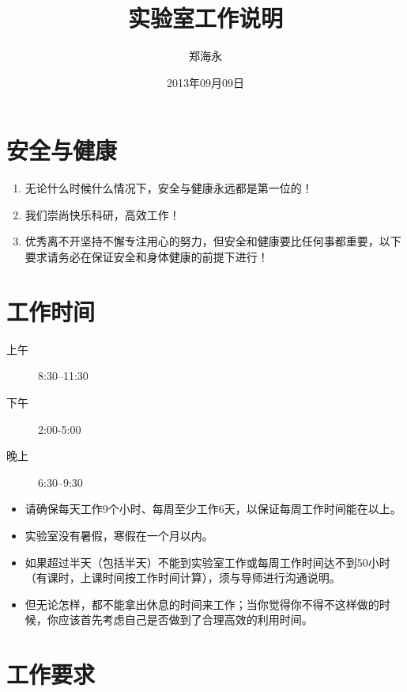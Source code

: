 \documentclass[a4paper，12pt]{article}
\title{实验室工作说明} %
\author{郑海永}
\date{2013年09月09日} %
\begin{document}
\maketitle

\section{安全与健康}

\begin{enumerate}
\item 无论什么时候什么情况下，安全与健康永远都是第一位的！
\item 我们崇尚快乐科研，高效工作！
\item 优秀离不开坚持不懈专注用心的努力，但安全和健康要比任何事都重要，以下要求请务必在保证安全和身体健康的前提下进行！
\end{enumerate}

\section{工作时间}

\begin{description}

\item[上午] 8:30--11:30

\item[下午] 2:00-5:00

\item[晚上] 6:30--9:30

\end{description}

\begin{itemize}

\item 请确保每天工作9个小时、每周至少工作6天，以保证每周工作时间能在{\color{red}{50小时}}以上。

\item 实验室没有暑假，寒假在一个月以内。

\item 如果超过半天（包括半天）不能到实验室工作或每周工作时间达不到50小时（有课时，上课时间按工作时间计算），须与导师进行沟通说明。

\item 但无论怎样，都不能拿出休息的时间来工作；当你觉得你不得不这样做的时候，你应该首先考虑自己是否做到了合理高效的利用时间。

\end{itemize}

\section{工作要求}
\end{document}
